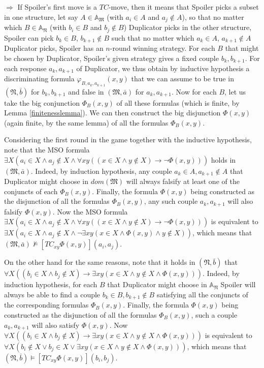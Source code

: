 \documentclass{LMCS}
\newcommand{\frM}{\mathfrak{M}}
\newcommand{\frN}{\mathfrak{N}}
\newcommand{\mso}{\textsf{MSO}\xspace}
\begin{document}
\begin{iteMize}{$\Rightarrow$}
If Spoiler's first move is a $TC$-move, then it means that
Spoiler picks a subset in one structure, let say $A \in
\mathbb{A}_\frM$ (with $a_i \in A$ and $a_j \not \in A$), so that
no matter which $B \in \mathbb{A}_\frN$ (with $b_i \in B$ and $b_j
\not \in B$) Duplicator picks in the other structure, Spoiler can
pick $b_k \in B$, $b_{k+1} \not \in B$ such that no matter which
$a_k \in A$, $a_{k+1} \not \in A$ Duplicator picks, Spoiler has an
$n$-round winning strategy. For each $B$ that might be chosen by
Duplicator, Spoiler's given strategy gives a fixed couple
$b_k,b_{k+1}$. For each response $a_k,a_{k+1}$ of Duplicator, we
thus obtain by inductive hypothesis a discriminating formula
$\varphi_{B,a_k,a_{k+1}}(x,y)$ that we can assume to be true in
$(\frN, \bar{b})$ for $b_k,b_{k+1}$ and false in $(\frM, \bar{a})$
for $a_k,a_{k+1}$. Now for each $B$, let us take the big
conjunction $\Phi_B(x,y)$ of all these formulas (which is finite,
by Lemma \ref{finitenesslemma}). We can then construct the big
disjunction $\Phi(x,y)$ (again finite, by the same lemma) of all
the formulas $\Phi_B(x,y)$.

Considering the first round in the game together with the inductive hypothesis, note that the \mso formula $\exists X
(a_i \in X \wedge a_j \not \in X \wedge \forall x y ((x \in X \wedge y \not \in X) \rightarrow \neg\Phi(x,y)))$ holds in $(\frM, \bar{a})$. Indeed, by induction
hypothesis, any couple $a_k \in A, a_{k+1} \not \in A$ that Duplicator might choose in $dom(\frM)$ will always falsify at least one of the conjuncts of
each $\Phi_B(x,y)$. Finally, the formula $\Phi(x,y)$ being constructed as the disjunction of all the formulas $\Phi_B(x,y)$, any such couple
$a_k,a_{k+1}$ will also falsify $\Phi(x,y)$. Now the \mso formula $\exists X (a_i \in X \wedge a_j \not \in X \wedge \forall
x y ((x \in X \wedge y \not \in X) \rightarrow \neg\Phi(x,y)))$ is equivalent to $\exists X (a_i \in X \wedge a_j \not \in X \wedge \neg \exists
x y (x \in X \wedge \Phi(x,y) \wedge y \not \in X))$, which means that $(\frM, \bar{a}) \not \models [TC_{xy}\Phi(x,y)](a_i,a_j)$.

On the other hand for the same reasons, note that it holds in $(\frN, \bar{b})$ that $\forall X ((b_i \in X \wedge b_j \not \in X) \rightarrow
\exists x y (x \in X \wedge y \not \in X \wedge \Phi(x,y)))$. Indeed, by induction hypothesis, for each $B$ that Duplicator might choose in
$\mathbb{A}_{\frN}$ Spoiler will always be able to find a couple $b_k \in B, b_{k+1} \not \in B$ satisfying all the conjuncts of the
corresponding formulas $\Phi_B(x,y)$. Finally, the formula $\Phi(x,y)$ being constructed as the disjunction of all the formulas $\Phi_B(x,y)$, such a couple
$a_k,a_{k+1}$ will also satisfy $\Phi(x,y)$. Now $\forall X ((b_i \in X \wedge b_j \not \in X) \rightarrow \exists x y (x \in X \wedge y \not \in X \wedge \Phi(x,y)))$ is equivalent to $\forall X (b_i \not \in X \vee b_j \in X \vee \exists x y
(x \in X \wedge y \not \in X \wedge \Phi(x,y)))$, which means that $(\frN, \bar{b}) \models [TC_{xy}\Phi(x,y)](b_i,b_j)$.


\end{iteMize}
\end{document}
